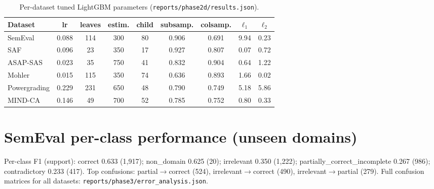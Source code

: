 \documentclass[11pt]{article}
\begin{document}
\begin{table}[h]
\centering\small
\begin{tabular}{lcccccccc}
\toprule
Dataset & lr & leaves & estim. & child & subsamp. & colsamp. & $\ell_1$ & $\ell_2$ \\
\midrule
SemEval      & 0.088 & 114 & 300 & 80 & 0.906 & 0.691 & 9.94 & 0.23 \\
SAF          & 0.096 & 23  & 350 & 17 & 0.927 & 0.807 & 0.07 & 0.72 \\
ASAP-SAS     & 0.023 & 35  & 750 & 41 & 0.832 & 0.904 & 0.64 & 1.22 \\
Mohler       & 0.015 & 115 & 350 & 74 & 0.636 & 0.893 & 1.66 & 0.02 \\
Powergrading & 0.229 & 231 & 650 & 48 & 0.790 & 0.749 & 5.18 & 5.86 \\
MIND-CA      & 0.146 & 49  & 700 & 52 & 0.785 & 0.752 & 0.80 & 0.33 \\
\bottomrule
\end{tabular}
\caption{Per-dataset tuned LightGBM parameters
(\texttt{reports/phase2d/results.json}).}
\label{tab:hpo}
\end{table}

\section{SemEval per-class performance (unseen domains)}
\label{app:confusion}
Per-class F1 (support): correct 0.633 (1{,}917); non\_domain 0.625 (20);
irrelevant 0.350 (1{,}222); partially\_correct\_incomplete 0.267 (986);
contradictory 0.233 (417). Top confusions: partial$\rightarrow$correct (524),
irrelevant$\rightarrow$correct (490), irrelevant$\rightarrow$partial (279).
Full confusion matrices for all datasets:
\texttt{reports/phase3/error\_analysis.json}.
\end{document}
